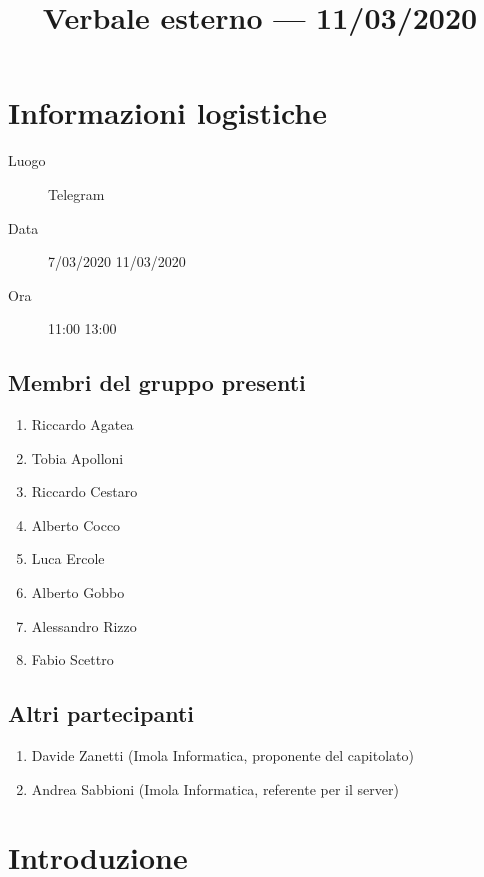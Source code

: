 \documentclass{article}
\title{Verbale esterno --- 11/03/2020}
\begin{document}


\section{Informazioni logistiche}%
\label{sec:informazioni_logistiche}

\begin{description}
  \item [Luogo] Telegram
  \item [Data] 7/03/2020  11/03/2020
  \item [Ora] 11:00  13:00
\end{description}

\subsection{Membri del gruppo presenti}%
\label{sub:membri_del_gruppo_presenti}

\begin{enumerate}
  \item Riccardo Agatea
  \item Tobia Apolloni
  \item Riccardo Cestaro
  \item Alberto Cocco
  \item Luca Ercole
  \item Alberto Gobbo
  \item Alessandro Rizzo
  \item Fabio Scettro
\end{enumerate}


\subsection{Altri partecipanti}%
\label{sub:altri_partecipanti}

\begin{enumerate}
  \item Davide Zanetti (Imola Informatica, proponente del capitolato)
  \item Andrea Sabbioni (Imola Informatica, referente per il server)
\end{enumerate}


\section{Introduzione}%
\label{sec:introduzione}
\end{document}
